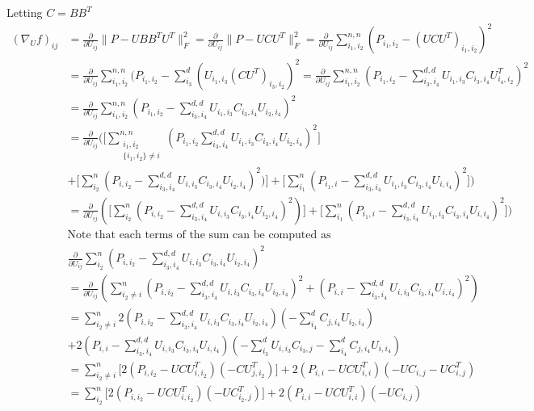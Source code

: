 \documentclass{report}
\begin{document}
   	Letting $ C = BB^T $
   	\begin{align*}
   		 (\nabla_{U}f)_{ij}
   		 &= \frac{\partial}{\partial U_{ij}}\|P - UBB^TU^T\|_F^2 
   		  = \frac{\partial}{\partial U_{ij}}\|P - UCU^T\|_F^2 
   		  = \frac{\partial}{\partial U_{ij}}\displaystyle \sum_{i_1,i_2}^{n,n} (P_{i_1,i_2} -  (UCU^T)_{i_1,i_2})^2 \\
   		 &= \frac{\partial}{\partial U_{ij}} \sum_{i_1,i_2}^{n,n} (P_{i_1,i_2} -    \sum_{i_3}^{d}(U_{i_1,i_3}(CU^T)_{i_3,i_2})^2 
   		  = \frac{\partial}{\partial U_{ij}} \sum_{i_1,i_2}^{n,n} (P_{i_1,i_2} - \sum_{i_3,i_4}^{d,d}U_{i_1,i_3}C_{i_3,i_4}U^T_{i_4,i_2})^2 \\
   		 &= \frac{\partial}{\partial U_{ij}} \sum_{i_1,i_2}^{n,n} (P_{i_1,i_2} - \sum_{i_3,i_4}^{d,d}U_{i_1,i_3}C_{i_3,i_4}U_{i_2,i_4})^2 \\
   		 &= \frac{\partial}{\partial U_{ij}}
   		 (\big[
	   		  \sum_{\substack{i_1,i_2 \\ \{i_1,i_2\} \neq i}}^{n,n} 
	   		  (P_{i_1,i_2} \sum_{i_3,i_4}^{d,d}U_{i_1,i_3}C_{i_3,i_4}U_{i_2,i_4})^2
  		  \big]\\
       &+ \big[
   		      \sum_{i_2}^n(P_{i,i_2} - \sum_{i_3,i_4}^{d,d}U_{i,i_3}C_{i_3,i_4}U_{i_2,i_4})^2)
   		    \big]
   		 +  \big[
   		      \sum_{i_1}^n(P_{i_1,i} - \sum_{i_3,i_4}^{d,d}U_{i_1,i_3}C_{i_3,i_4}U_{i,i_4})^2
   		    \big]) \\
   		 &=\frac{\partial}{\partial U_{ij}}(
   		  \big[
   		 \sum_{i_2}^n(P_{i,i_2} - \sum_{i_3,i_4}^{d,d}U_{i,i_3}C_{i_3,i_4}U_{i_2,i_4})^2)
   		 \big]
   		 +  \big[
   		 \sum_{i_1}^n(P_{i_1,i} - \sum_{i_3,i_4}^{d,d}U_{i_1,i_3}C_{i_3,i_4}U_{i,i_4})^2
   		 \big]) \\
   		 &\text{Note that each terms of the sum can be computed as}\\
   		 & \frac{\partial}{\partial U_{ij}}
   		 \sum_{i_2}^n
   		 (P_{i,i_2} - \sum_{i_3,i_4}^{d,d}U_{i,i_3}C_{i_3,i_4}U_{i_2,i_4})^2 \\
   		 &= \frac{\partial}{\partial U_{ij}}
   		 (\sum_{i_2 \neq i}^n
   		 (P_{i,i_2} - \sum_{i_3,i_4}^{d,d}U_{i,i_3}C_{i_3,i_4}U_{i_2,i_4})^2 
   		 + (P_{i,i} - \sum_{i_3,i_4}^{d,d}U_{i,i_3}C_{i_3,i_4}U_{i,i_4})^2) \\
   		 &= \sum_{i_2 \neq i}^n
   		 2(P_{i,i_2} - \sum_{i_3,i_4}^{d,d}U_{i,i_3}C_{i_3,i_4}U_{i_2,i_4})
   		 (- \sum_{i_4}^{d}C_{j,i_4}U_{i_2,i_4})\\
   		 &+ 2(P_{i,i} - \sum_{i_3,i_4}^{d,d}U_{i,i_3}C_{i_3,i_4}U_{i,i_4})
   		 (-\sum_{i_3}^{d}U_{i,i_3}C_{i_3,j} -\sum_{i_4}^{d}C_{j,i_4}U_{i,i_4})\\
   		 &=\sum_{i_2 \neq i}^n
   		 \big[
   		 2(P_{i,i_2} - UCU^T_{i,i_2})(-CU^T_{j,i_2})
   		 \big]
   		 +2(P_{i,i} - UCU^T_{i,i})
   		 (-UC_{i,j} -UC^T_{i,j})\\   		 
   		 &=\sum_{i_2}^n
   		 \big[
   		 2(P_{i,i_2} - UCU^T_{i,i_2})(-UC^T_{i_2,j})
   		 \big]
   		 +2(P_{i,i} - UCU^T_{i,i})
   		 (-UC_{i,j})\\
   		 \end{align*}
\end{document}
